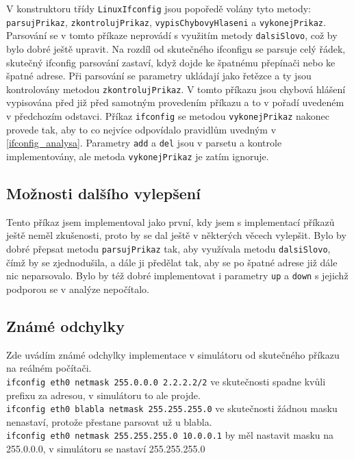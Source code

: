 V konstruktoru třídy \verb|LinuxIfconfig| jsou popoředě volány tyto metody: \verb|parsujPrikaz|, \verb|zkontrolujPrikaz|, \verb|vypisChybovyHlaseni| a \verb|vykonejPrikaz|. Parsování se v tomto příkaze neprovádí s využitím metody \verb|dalsiSlovo|, což by bylo dobré ještě upravit. Na rozdíl od skutečného ifconfigu se parsuje celý řádek, skutečný ifconfig parsování zastaví, když dojde ke špatnému přepínači nebo ke špatné adrese. Při parsování se parametry ukládají jako řetězce a ty jsou kontrolovány metodou \verb|zkontrolujPrikaz|. V tomto příkazu jsou chybová hlášení vypisována před již před samotným provedením příkazu a to v pořadí uvedeném v předchozím odstavci. Příkaz \verb|ifconfig| se metodou \verb|vykonejPrikaz| nakonec provede tak, aby to co nejvíce odpovídalo pravidlům uvedným v \ref{ifconfig_analysa}. Parametry \verb|add| a \verb|del| jsou v parsetu a kontrole implementovány, ale metoda \verb|vykonejPrikaz| je zatím ignoruje.


\subsection{Možnosti dalšího vylepšení}

Tento příkaz jsem implementoval jako první, kdy jsem s implementací příkazů ještě neměl zkušenosti, proto by se dal ještě v některých věcech vylepšit. Bylo by dobré přepsat metodu \verb|parsujPrikaz| tak, aby využívala metodu \verb|dalsiSlovo|, čímž by se zjednodušila, a dále ji předělat tak, aby se po špatné adrese již dále nic neparsovalo. Bylo by též dobré implementovat i parametry \verb|up| a \verb|down| s jejichž podporou se v analýze nepočítalo.


\subsection{Známé odchylky}

Zde uvádím známé odchylky implementace v simulátoru od skutečného příkazu na reálném počítači.\\
\verb|ifconfig eth0 netmask 255.0.0.0 2.2.2.2/2| ve skutečnosti spadne kvůli prefixu za adresou, v simulátoru to ale projde.\\
\verb|ifconfig eth0 blabla netmask 255.255.255.0| ve skutečnosti žádnou masku nenastaví, protože přestane parsovat už u blabla.\\
\verb|ifconfig eth0 netmask 255.255.255.0 10.0.0.1| by měl nastavit masku na 255.0.0.0, v simulátoru se nastaví 255.255.255.0



